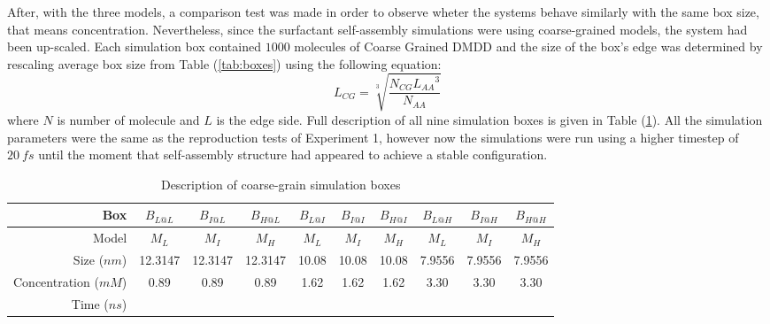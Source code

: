 \documentclass[10pt,a4paper,twoside]{article}
\begin{document}
  After, with the three models, a comparison test was made in order to observe wheter the systems behave similarly with the same box size, that means concentration. Nevertheless, since the surfactant self-assembly simulations were using coarse-grained models, the system had been up-scaled. Each simulation box contained $1000$ molecules of Coarse Grained DMDD and the size of the box's edge was determined by rescaling average box size from Table (\ref{tab:boxes}) using the following equation:  
\begin{equation}
L_{CG}=\sqrt[3]{\frac{N_{CG} {L_{AA}}^3}{N_{AA}}}
\label{eqn:bsize}
\end{equation}
where $N$ is number of molecule and $L$ is the edge side. Full description of all nine simulation boxes is given in Table (\ref{tab:cgbox}). All the simulation parameters were the same as the reproduction tests of Experiment 1, however now the simulations were run using a higher timestep of $20\ fs$ until the moment that self-assembly structure had appeared to achieve a stable configuration.
\begin{table}[ht!] 
  \centering
\begin{threeparttable}

  \caption{Description of coarse-grain simulation boxes}

\begin{tabular}{|r|c|c|c||c|c|c||c|c|c|}
\hline
Box                  & $B_{L@L}$ & $B_{I@L}$ & $B_{H@L}$ & $B_{L@I}$ & $B_{I@I}$ & $B_{H@I}$ & $B_{L@H}$ & $B_{I@H}$ & $B_{H@H}$ \\ \hline
Model                &     $M_{L}$      &   $M_{I}$       &      $M_{H}$     &     $M_{L}$      &     $M_{I}$      &       $M_{H}$    &      $M_{L}$     &   $M_{I}$        &     $M_{H}$      \\ \hline
Size ($nm$)          &     12.3147      &      12.3147      &     12.3147      &     10.08      &      10.08          &      10.08          &      7.9556     &     7.9556     &     7.9556      \\ \hline
Concentration ($mM$) &     0.89      &     0.89      &    0.89       &    1.62       &          1.62 &     1.62      &    3.30       &     3.30      &     3.30      \\ \hline
Time ($ns$)          &           &           &           &           &           &           &           &           &           \\ \hline
\end{tabular}
  \label{tab:cgbox}%
\end{threeparttable} 
\end{table}
\end{document}
